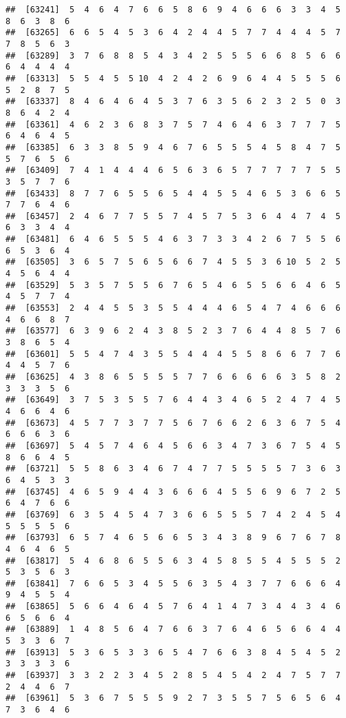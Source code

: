 \documentclass[
]{book}
\begin{document}
\begin{verbatim}
##  [63241]  5  4  6  4  7  6  6  5  8  6  9  4  6  6  6  3  3  4  5  8  6  3  8  6
##  [63265]  6  6  5  4  5  3  6  4  2  4  4  5  7  7  4  4  4  5  7  7  8  5  6  3
##  [63289]  3  7  6  8  8  5  4  3  4  2  5  5  5  6  6  8  5  6  6  6  4  4  4  4
##  [63313]  5  5  4  5  5 10  4  2  4  2  6  9  6  4  4  5  5  5  6  5  2  8  7  5
##  [63337]  8  4  6  4  6  4  5  3  7  6  3  5  6  2  3  2  5  0  3  8  6  4  2  4
##  [63361]  4  6  2  3  6  8  3  7  5  7  4  6  4  6  3  7  7  7  5  6  4  6  4  5
##  [63385]  6  3  3  8  5  9  4  6  7  6  5  5  5  4  5  8  4  7  5  5  7  6  5  6
##  [63409]  7  4  1  4  4  4  6  5  6  3  6  5  7  7  7  7  7  5  5  3  5  7  7  6
##  [63433]  8  7  7  6  5  5  6  5  4  4  5  5  4  6  5  3  6  6  5  7  7  6  4  6
##  [63457]  2  4  6  7  7  5  5  7  4  5  7  5  3  6  4  4  7  4  5  6  3  3  4  4
##  [63481]  6  4  6  5  5  5  4  6  3  7  3  3  4  2  6  7  5  5  6  6  5  3  6  4
##  [63505]  3  6  5  7  5  6  5  6  6  7  4  5  5  3  6 10  5  2  5  4  5  6  4  4
##  [63529]  5  3  5  7  5  5  6  7  6  5  4  6  5  5  6  6  4  6  5  4  5  7  7  4
##  [63553]  2  4  4  5  5  3  5  5  4  4  4  6  5  4  7  4  6  6  6  4  6  6  8  7
##  [63577]  6  3  9  6  2  4  3  8  5  2  3  7  6  4  4  8  5  7  6  3  8  6  5  4
##  [63601]  5  5  4  7  4  3  5  5  4  4  4  5  5  8  6  6  7  7  6  4  4  5  7  6
##  [63625]  4  3  8  6  5  5  5  5  7  7  6  6  6  6  6  3  5  8  2  3  3  3  5  6
##  [63649]  3  7  5  3  5  5  7  6  4  4  3  4  6  5  2  4  7  4  5  4  6  6  4  6
##  [63673]  4  5  7  7  3  7  7  5  6  7  6  6  2  6  3  6  7  5  4  6  6  6  3  6
##  [63697]  5  4  5  7  4  6  4  5  6  6  3  4  7  3  6  7  5  4  5  8  6  6  4  5
##  [63721]  5  5  8  6  3  4  6  7  4  7  7  5  5  5  5  7  3  6  3  6  4  5  3  3
##  [63745]  4  6  5  9  4  4  3  6  6  6  4  5  5  6  9  6  7  2  5  6  4  7  6  6
##  [63769]  6  3  5  4  5  4  7  3  6  6  5  5  5  7  4  2  4  5  4  5  5  5  5  6
##  [63793]  6  5  7  4  6  5  6  6  5  3  4  3  8  9  6  7  6  7  8  4  6  4  6  5
##  [63817]  5  4  6  8  6  5  5  6  3  4  5  8  5  5  4  5  5  5  2  5  3  5  6  3
##  [63841]  7  6  6  5  3  4  5  5  6  3  5  4  3  7  7  6  6  6  4  9  4  5  5  4
##  [63865]  5  6  6  4  6  4  5  7  6  4  1  4  7  3  4  4  3  4  6  6  5  6  6  4
##  [63889]  1  4  8  5  6  4  7  6  6  3  7  6  4  6  5  6  6  4  4  5  3  3  6  7
##  [63913]  5  3  6  5  3  3  6  5  4  7  6  6  3  8  4  5  4  5  2  3  3  3  3  6
##  [63937]  3  3  2  2  3  4  5  2  8  5  4  5  4  2  4  7  5  7  7  2  4  4  6  7
##  [63961]  5  3  6  7  5  5  5  9  2  7  3  5  5  7  5  6  5  6  4  7  3  6  4  6

\end{verbatim}
\end{document}
